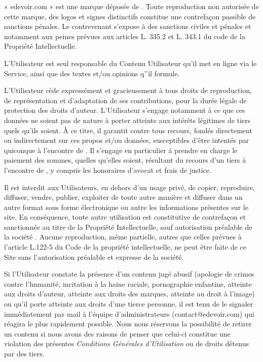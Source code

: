 « edevoir.com » est une marque déposée de \eDevoir. Toute reproduction non autorisée de cette marque, des logos et signes distinctifs constitue une contrefaçon passible de sanctions pénales. Le contrevenant s'expose à des sanctions civiles et pénales et notamment aux peines prévues aux articles L. 335.2 et L. 343.1 du code de la Propriété Intellectuelle.

L’Utilisateur est seul responsable du Contenu Utilisateur qu’il met en ligne via le Service, ainsi que des textes et/ou opinions q'’il formule.

L'Utilisateur cède expressément et gracieusement à \eDevoir tous droits de reproduction, de représentation et d'adaptation de ses contributions, pour la durée légale de protection des droits d'auteur. L'Utilisateur s'engage notamment à ce que ces données ne soient pas de nature à porter atteinte aux intérêts légitimes de tiers quels qu'ils soient. À ce titre, il garantit \eDevoir contre tous recours, fondés directement ou indirectement sur ces propos et/ou données, susceptibles d'être intentés par quiconque à l'encontre de \eDevoir. Il s'engage en particulier à prendre en charge le paiement des sommes, quelles qu'elles soient, résultant du recours d'un tiers à l'encontre de \eDevoir, y compris les honoraires d'avocat et frais de justice.

Il est interdit aux Utilisateurs, en dehors d'un usage privé, de copier, reproduire, diffuser, vendre, publier, exploiter de toute autre manière et diffuser dans un autre format sous forme électronique ou autre les informations présentes sur le site. En conséquence, toute autre utilisation est constitutive de contrefaçon et sanctionnée au titre de la Propriété Intellectuelle, sauf autorisation préalable de la société \eDevoir. Aucune reproduction, même partielle, autres que celles prévues à l'article L.122-5 du Code de la propriété intellectuelle, ne peut être faite de ce Site sans l'autorisation préalable et expresse de la société.

Si l'Utilisateur constate la présence d'un contenu jugé abusif (apologie de crimes contre l'humanité, incitation à la haine raciale, pornographie enfantine, atteinte aux droits d'auteur, atteinte aux droits des marques, atteinte au droit à l'image) ou qu'il porte atteinte aux droits d'une tierce personne, il est tenu de le signaler immédiatement par mail à l'équipe d'administrateurs (contact@edevoir.com) qui réagira le plus rapidement possible. Nous nous réservons la possibilité de retirer un contenu si nous avons des raisons de penser que celui-ci constitue une violation des présentes \textit{Conditions Générales d'Utilisation} ou de droits détenus par des tiers.

